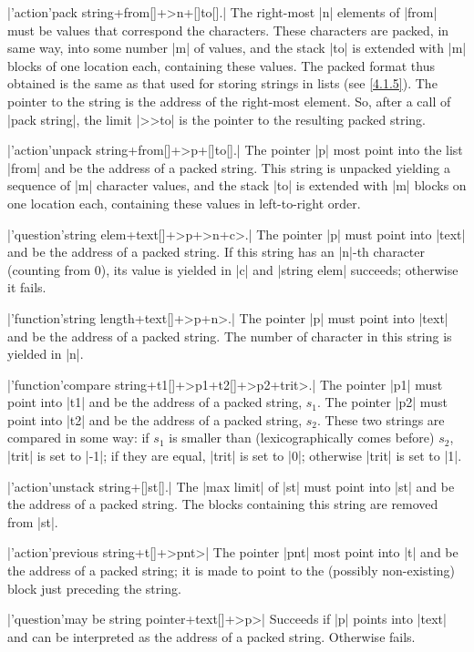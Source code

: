 \documentclass{article}
\newcommand\g[1]{{\sf #1}}
\let\oref\ref
\let\ref\oref
\begin{document}
\X\pp|'action'pack string+from[]+>n+[]to[].|\Y
The right-most \pp|n| elements of \pp|from| must be values that correspond
the characters. These characters are packed, in same way, into some number
\pp|m| of values, and the stack \pp|to| is extended with \pp|m| blocks of
one location each, containing these values. The packed format thus obtained
is the same as that used for storing \g{string}s in lists (see \ref{4.1.5}).
The pointer to the string is the address of the right-most element. So,
after a call of \pp|pack string|, the \g{limit} \pp|>>to| is the pointer to
the resulting packed string.

\X\pp|'action'unpack string+from[]+>p+[]to[].|\Y
The pointer \pp|p| most point into the list \pp|from| and be the address of
a packed string. This string is unpacked yielding a sequence of \pp|m|
character values, and the stack \pp|to| is extended with \pp|m| blocks on
one location each, containing these values in left-to-right order.

\X\pp|'question'string elem+text[]+>p+>n+c>.|\Y
The pointer \pp|p| must point into \pp|text| and be the address of a packed
string. If this string has an \pp|n|-th character (counting from 0), its
value is yielded in \pp|c| and \pp|string elem| succeeds; otherwise it
fails.

\X\pp|'function'string length+text[]+>p+n>.|\Y
The pointer \pp|p| must point into \pp|text| and be the address of a packed
string. The number of character in this string is yielded in \pp|n|.

\X\pp|'function'compare string+t1[]+>p1+t2[]+>p2+trit>.|\Y
The pointer \pp|p1| must point into \pp|t1| and be the address of a packed
string, $s_1$. The pointer \pp|p2| must point into \pp|t2| and be the
address of a packed string, $s_2$. These two strings are compared in some
way: if $s_1$ is smaller than (lexicographically comes before) $s_2$, \pp|trit| is
set to \pp|-1|; if they are equal, \pp|trit| is set to \pp|0|; otherwise
\pp|trit| is set to \pp|1|.

\X\pp|'action'unstack string+[]st[].|\Y
The \pp|max limit| of \pp|st| must point into \pp|st| and be the address of
a packed string. The blocks containing this string are removed from \pp|st|.

\X\pp|'action'previous string+t[]+>pnt>|\Y
The pointer \pp|pnt| most point into \pp|t| and be the address of a packed
string; it is made to point to the (possibly non-existing) block just
preceding the string.

\X\pp|'question'may be string pointer+text[]+>p>|\Y
Succeeds if \pp|p| points into \pp|text| and can be interpreted as the
address of a packed string. Otherwise fails.
\end{document}
